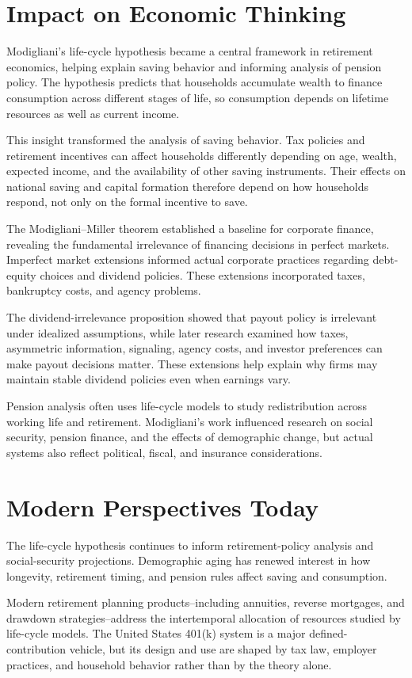 \section{Impact on Economic Thinking}
Modigliani's life-cycle hypothesis became a central framework in retirement
economics, helping explain saving behavior and informing analysis of pension
policy. The hypothesis predicts that households accumulate wealth to finance
consumption across different stages of life, so consumption depends on
lifetime resources as well as current income.

This insight transformed the analysis of saving behavior. Tax policies and
retirement incentives can affect households differently depending on age,
wealth, expected income, and the availability of other saving instruments.
Their effects on national saving and capital formation therefore depend on
how households respond, not only on the formal incentive to save.

The Modigliani--Miller theorem established a baseline for
corporate finance, revealing the fundamental irrelevance of financing
decisions in perfect markets. Imperfect market extensions informed actual
corporate practices regarding debt-equity choices and dividend policies.
These extensions incorporated taxes, bankruptcy costs, and agency problems.

The dividend-irrelevance proposition showed that payout policy is irrelevant
under idealized assumptions, while later research examined how taxes,
asymmetric information, signaling, agency costs, and investor preferences can
make payout decisions matter. These extensions help explain why firms may
maintain stable dividend policies even when earnings vary.

Pension analysis often uses life-cycle models to study redistribution across
working life and retirement. Modigliani's work influenced research on social
security, pension finance, and the effects of demographic change, but actual
systems also reflect political, fiscal, and insurance considerations.

\section{Modern Perspectives Today}
The life-cycle hypothesis continues to inform retirement-policy analysis and
social-security projections. Demographic aging has renewed interest in how
longevity, retirement timing, and pension rules affect saving and consumption.

Modern retirement planning products--including annuities, reverse mortgages,
and drawdown strategies--address the intertemporal allocation of resources
studied by life-cycle models. The United States 401(k) system is a major
defined-contribution vehicle, but its design and use are shaped by tax law,
employer practices, and household behavior rather than by the theory alone.

